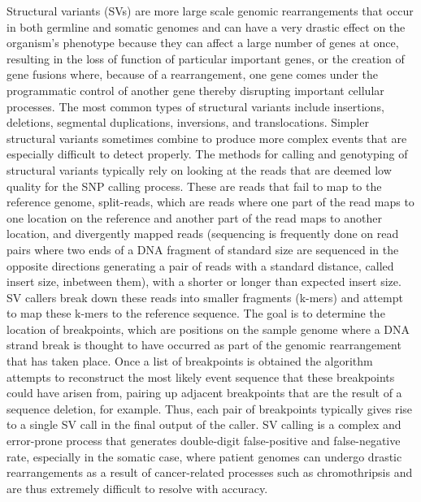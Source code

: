 Structural variants (SVs) are more large scale genomic rearrangements that occur in both germline and somatic genomes and can have a very drastic effect on the organism's phenotype because they can affect a large number of genes at once, resulting in the loss of function of particular important genes, or the creation of gene fusions where, because of a rearrangement, one gene comes under the programmatic control of another gene thereby disrupting important cellular processes. The most common types of structural variants include insertions, deletions, segmental duplications, inversions, and translocations. Simpler structural variants sometimes combine to produce more complex events that are especially difficult to detect properly. The methods for calling and genotyping of structural variants typically rely on looking at the reads that are deemed low quality for the SNP calling process. These are reads that fail to map to the reference genome, split-reads, which are reads where one part of the read maps to one location on the reference and another part of the read maps to another location, and divergently mapped reads (sequencing is frequently done on read pairs where two ends of a DNA fragment of standard size are sequenced in the opposite directions generating a pair of reads with a standard distance, called insert size, inbetween them), with a shorter or longer than expected insert size. SV callers break down these reads into smaller fragments (k-mers) and attempt to map these k-mers to the reference sequence. The goal is to determine the location of breakpoints, which are positions on the sample genome where a DNA strand break is thought to have occurred as part of the genomic rearrangement that has taken place. Once a list of breakpoints is obtained the algorithm attempts to reconstruct the most likely event sequence that these breakpoints could have arisen from, pairing up adjacent breakpoints that are the result of a sequence deletion, for example. Thus, each pair of breakpoints typically gives rise to a single SV call in the final output of the caller. SV calling is a complex and error-prone process that generates double-digit false-positive and false-negative rate, especially in the somatic case, where patient genomes can undergo drastic rearrangements as a result of cancer-related processes such as chromothripsis and are thus extremely difficult to resolve with accuracy.

